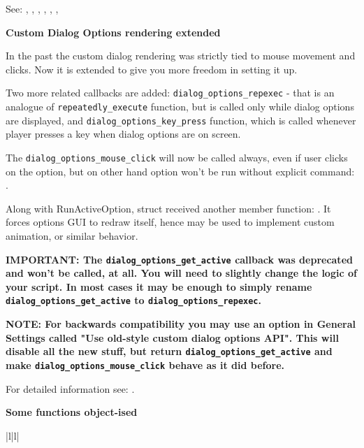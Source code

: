 See:
,
,
,
,
,
,

\bf{Custom Dialog Options rendering extended}

In the past the custom dialog rendering was strictly tied to mouse movement and clicks. Now it is
extended to give you more freedom in setting it up.

Two more related callbacks are added: \verb$dialog_options_repexec$ - that is an analogue of
\verb$repeatedly_execute$ function, but is called only while dialog options are displayed, and
\verb$dialog_options_key_press$ function, which is called whenever player presses a key when dialog
options are on screen.

The \verb$dialog_options_mouse_click$ will now be called always, even if user clicks on the option, but
on other hand option won't be run without explicit command: .

Along with RunActiveOption,  struct
received another member function: . It forces
options GUI to redraw itself, hence may be used to implement custom animation, or similar behavior.

\bf{IMPORTANT:} The \verb$dialog_options_get_active$ callback was deprecated and won't be called, at all.
You will need to slightly change the logic of your script. In most cases it may be enough to simply rename
\verb$dialog_options_get_active$ to \verb$dialog_options_repexec$.

\bf{NOTE:} For backwards compatibility you may use an option in General Settings called "Use old-style
custom dialog options API". This will disable all the new stuff, but return \verb$dialog_options_get_active$
and make \verb$dialog_options_mouse_click$ behave as it did before.

For detailed information see: .

\bf{Some functions object-ised}

\begin{tabular}{|l|l|}
\end{tabular}

